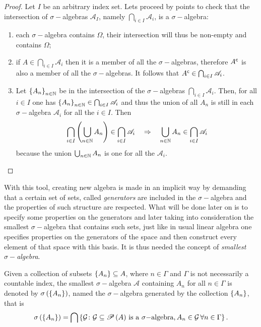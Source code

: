 \begin{proof}
    Let $I$ be an arbitrary index set. Lets proceed by points to check that the intersection of $\sigma-$algebras $\mathscr{A}_{I}$, namely $\bigcap_{i\in I}\mathscr{A}_{i}$, is a $\sigma-$algebra:
    \begin{enumerate}[label=(\roman*)]
        \item each $\sigma-$algebra contains $\Omega$, their intersection will thus be non-empty and contains $\Omega$;
        \item if $A\in\bigcap_{i\in I}\mathscr{A}_{i}$ then it is a member of all the $\sigma-$algebras, therefore ${A}^{\mathsf{c}}$ is also a member of all the $\sigma-$algebras. It follows that ${A}^{\mathsf{c}}\in\bigcap_{i\in I}\mathscr{A}_{i}$.
        \item Let $\left\lbrace A_{n} \right\rbrace_{n\in\mathbb{ N}}$ be in the intersection of the $\sigma-$algebras $\bigcap_{i\in I}\mathscr{A}_{i}$. Then, for all $i\in I$ one has $\left\lbrace A_{n} \right\rbrace_{n\in\mathbb{ N}}\in\bigcap_{i\in I}\mathscr{A}_{i}$ and thus the union of all $A_{n}$ is still in each $\sigma-$algebra $\mathscr{A}_{i}$ for all the $i\in I$. Then
        \begin{equation*}
            \bigcap_{i\in I}\left( \bigcup_{n\in\mathbb{ N}}A_{n} \right)\in\bigcap_{i\in I}\mathscr{A}_{i} \quad \Rightarrow \quad \bigcup_{n\in\mathbb{ N}}A_{n}\in\bigcap_{i\in I}\mathscr{A}_{i}
        \end{equation*}
        because the union $\bigcup_{n\in\mathbb{ N}}A_{n}$ is one for all the $\mathscr{A}_{i}$.
    \end{enumerate}
\end{proof}
With this tool, creating new algebra is made in an implicit way by demanding that a certain set of sets, called \emph{generators} are included in the $\sigma-$algebra and the properties of such structure are respected. What will be done later on is to specify some properties on the generators and later taking into consideration the smallest $\sigma-$algebra that contains such sets, just like in usual linear algebra one specifies properties on the generators of the space and then construct every element of that space with this basis. It is thus needed the concept of \emph{smallest $\sigma-$algebra}.
\begin{definition}\label{def:SmallestSigmaAlgebra}
    Given a collection of subsets $\left\lbrace A_{n} \right\rbrace\subseteq A$, where $n\in\Gamma$ and $\Gamma$ is not necessarily a countable index, the smallest $\sigma-$algebra $\mathscr{A}$ containing $A_{n}$ for all $n\in\Gamma$ is denoted by $\sigma\left( \left\lbrace A_{n} \right\rbrace \right)$, named the $\sigma-$algebra generated by the collection $\left\lbrace A_{n} \right\rbrace$, that is
    \begin{equation}
        \sigma\left( \left\lbrace A_{n} \right\rbrace \right) = \bigcap\left\lbrace \mathcal{G}\colon\mathcal{G}\subseteq\mathscr{P}\left( A \right) \,\text{is a $\sigma-$algebra,}\, A_{n}\in\mathcal{G}\,\forall n \in\Gamma \right\rbrace.
    \end{equation}
\end{definition}
